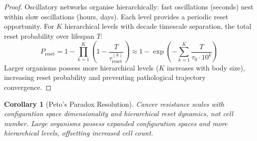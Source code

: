 \documentclass[11pt,a4paper]{article}
\newtheorem{corollary}[theorem]{Corollary}
\theoremstyle{remark}
\begin{document}
\begin{proof}
Oscillatory networks organise hierarchically: fast oscillations (seconds) nest within slow oscillations (hours, days). Each level provides a periodic reset opportunity. For $K$ hierarchical levels with decade timescale separation, the total reset probability over lifespan $T$:
\begin{equation}
P_{\text{reset}} = 1 - \prod_{k=1}^K \left(1 - \frac{T}{\tau_{\text{reset}}^{(k)}}\right) \approx 1 - \exp\left(-\sum_{k=1}^K \frac{T}{\tau_0 \cdot 10^k}\right)
\end{equation}
Larger organisms possess more hierarchical levels ($K$ increases with body size), increasing reset probability and preventing pathological trajectory convergence.
\end{proof}

\begin{corollary}[Peto's Paradox Resolution]
\label{cor:peto_resolution}
Cancer resistance scales with configuration space dimensionality and hierarchical reset dynamics, not cell number. Large organisms possess expanded configuration spaces and more hierarchical levels, offsetting increased cell count.
\end{corollary}
\end{document}
